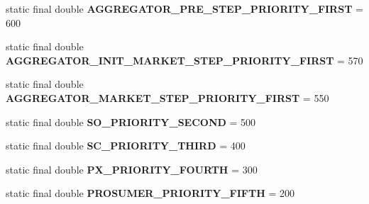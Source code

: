 \begin{DoxyCompactItemize}
\item 
\hypertarget{classuk_1_1ac_1_1dmu_1_1iesd_1_1cascade_1_1base_1_1_consts_a422258b1e8b3ac914d539854f7548a22}{static final double {\bfseries A\-G\-G\-R\-E\-G\-A\-T\-O\-R\-\_\-\-P\-R\-E\-\_\-\-S\-T\-E\-P\-\_\-\-P\-R\-I\-O\-R\-I\-T\-Y\-\_\-\-F\-I\-R\-S\-T} = 600}\label{classuk_1_1ac_1_1dmu_1_1iesd_1_1cascade_1_1base_1_1_consts_a422258b1e8b3ac914d539854f7548a22}

\item 
\hypertarget{classuk_1_1ac_1_1dmu_1_1iesd_1_1cascade_1_1base_1_1_consts_af1d1dcf81482fbfd75011e7aada0449b}{static final double {\bfseries A\-G\-G\-R\-E\-G\-A\-T\-O\-R\-\_\-\-I\-N\-I\-T\-\_\-\-M\-A\-R\-K\-E\-T\-\_\-\-S\-T\-E\-P\-\_\-\-P\-R\-I\-O\-R\-I\-T\-Y\-\_\-\-F\-I\-R\-S\-T} = 570}\label{classuk_1_1ac_1_1dmu_1_1iesd_1_1cascade_1_1base_1_1_consts_af1d1dcf81482fbfd75011e7aada0449b}

\item 
\hypertarget{classuk_1_1ac_1_1dmu_1_1iesd_1_1cascade_1_1base_1_1_consts_ad65e2fd41d598580553868d16a549e85}{static final double {\bfseries A\-G\-G\-R\-E\-G\-A\-T\-O\-R\-\_\-\-M\-A\-R\-K\-E\-T\-\_\-\-S\-T\-E\-P\-\_\-\-P\-R\-I\-O\-R\-I\-T\-Y\-\_\-\-F\-I\-R\-S\-T} = 550}\label{classuk_1_1ac_1_1dmu_1_1iesd_1_1cascade_1_1base_1_1_consts_ad65e2fd41d598580553868d16a549e85}

\item 
\hypertarget{classuk_1_1ac_1_1dmu_1_1iesd_1_1cascade_1_1base_1_1_consts_a6be2a7dfc30ae1245b7044db8690d4da}{static final double {\bfseries S\-O\-\_\-\-P\-R\-I\-O\-R\-I\-T\-Y\-\_\-\-S\-E\-C\-O\-N\-D} = 500}\label{classuk_1_1ac_1_1dmu_1_1iesd_1_1cascade_1_1base_1_1_consts_a6be2a7dfc30ae1245b7044db8690d4da}

\item 
\hypertarget{classuk_1_1ac_1_1dmu_1_1iesd_1_1cascade_1_1base_1_1_consts_ae29d84dd5fac5c7615e7ffdfa3e36229}{static final double {\bfseries S\-C\-\_\-\-P\-R\-I\-O\-R\-I\-T\-Y\-\_\-\-T\-H\-I\-R\-D} = 400}\label{classuk_1_1ac_1_1dmu_1_1iesd_1_1cascade_1_1base_1_1_consts_ae29d84dd5fac5c7615e7ffdfa3e36229}

\item 
\hypertarget{classuk_1_1ac_1_1dmu_1_1iesd_1_1cascade_1_1base_1_1_consts_ace86d0a78e78f2dfe334011b0c665f1a}{static final double {\bfseries P\-X\-\_\-\-P\-R\-I\-O\-R\-I\-T\-Y\-\_\-\-F\-O\-U\-R\-T\-H} = 300}\label{classuk_1_1ac_1_1dmu_1_1iesd_1_1cascade_1_1base_1_1_consts_ace86d0a78e78f2dfe334011b0c665f1a}

\item 
\hypertarget{classuk_1_1ac_1_1dmu_1_1iesd_1_1cascade_1_1base_1_1_consts_a67233a75ea3bc16b9b2e79cf54f7e9ba}{static final double {\bfseries P\-R\-O\-S\-U\-M\-E\-R\-\_\-\-P\-R\-I\-O\-R\-I\-T\-Y\-\_\-\-F\-I\-F\-T\-H} = 200}\label{classuk_1_1ac_1_1dmu_1_1iesd_1_1cascade_1_1base_1_1_consts_a67233a75ea3bc16b9b2e79cf54f7e9ba}


\end{DoxyCompactItemize}
